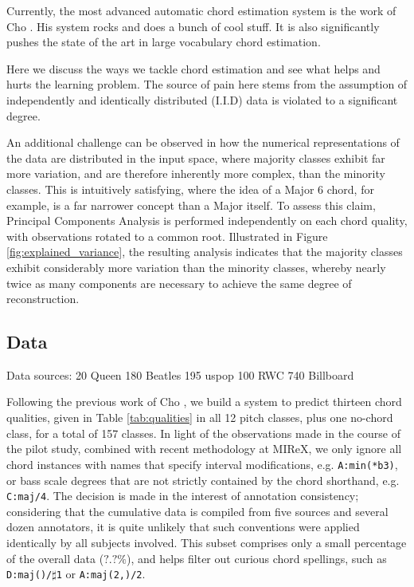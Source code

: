 Currently, the most advanced automatic chord estimation system is the work of Cho \cite{Cho2014}.
His system rocks and does a bunch of cool stuff.
It is also significantly pushes the state of the art in large vocabulary chord estimation.


Here we discuss the ways we tackle chord estimation and see what helps and hurts the learning problem.
The source of pain here stems from the assumption of independently and identically distributed (I.I.D) data is violated to a significant degree.


An additional challenge can be observed in how the numerical representations of the data are distributed in the input space, where majority classes exhibit far more variation, and are therefore inherently more complex, than the minority classes.
This is intuitively satisfying, where the idea of a Major 6 chord, for example, is a far narrower concept than a Major itself.
To assess this claim, Principal Components Analysis is performed independently on each chord quality, with observations rotated to a common root.
Illustrated in Figure \ref{fig:explained_variance}, the resulting analysis indicates that the majority classes exhibit considerably more variation than the minority classes, whereby nearly twice as many components are necessary to achieve the same degree of reconstruction.


\subsection{Data}

Data sources:
20 Queen
180 Beatles
195 uspop
100 RWC
740 Billboard

Following the previous work of Cho \cite{Cho2014}, we build a system to predict thirteen chord qualities, given in Table \ref{tab:qualities} in all 12 pitch classes, plus one no-chord class, for a total of 157 classes.
In light of the observations made in the course of the pilot study, combined with recent methodology at MIReX, we only ignore all chord instances with names that specify interval modifications, e.g. \texttt{A:min(*b3)}, or bass scale degrees that are not strictly contained by the chord shorthand, e.g. \texttt{C:maj/4}.
The decision is made in the interest of annotation consistency; considering that the cumulative data is compiled from five sources and several dozen annotators, it is quite unlikely that such conventions were applied identically by all subjects involved.
This subset comprises only a small percentage of the overall data ($?.?\%$), and helps filter out curious chord spellings, such as \texttt{D:maj()/$\sharp$1} or \texttt{A:maj(2,)/2}.

